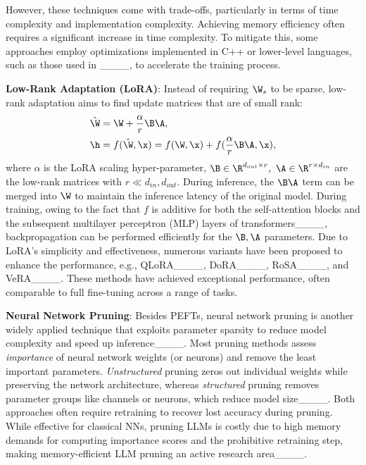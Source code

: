 However, these techniques come with trade-offs, particularly in terms of time complexity and implementation complexity. Achieving memory efficiency often requires a significant increase in time complexity. To mitigate this, some approaches employ optimizations implemented in C++ or lower-level languages, such as those used in ____, to accelerate the training process. 

\textbf{Low-Rank Adaptation (LoRA)}: Instead of requiring $\W_s$ to be sparse, low-rank adaptation aims to find update matrices that are of small rank:
\begin{align}
    & \hat{\W}=\W + \frac{\alpha}{r}\B\A \label{eq:lora_w}, \\
    & \h = f(\hat{\W}, \x) = f(\W, \x) + f(\frac{\alpha}{r}\B\A, \x), \label{eq:lora_fwd}
\end{align}
where $\alpha$ is the LoRA scaling hyper-parameter, \iffalse $r$ is the middle dimensionality of the low-rank matrices, \fi$\B\in \R^{d_{out}\times r},\ \A\in \R^{r\times d_{in}}$ are the low-rank matrices with $r\ll d_{in},d_{out}$. During inference, the $\B \A$ term can be merged into $\W$ to maintain the inference latency of the original model. During training, owing to the fact that $f$ is additive for both the self-attention blocks and the subsequent multilayer perceptron (MLP) layers of transformers____, backpropagation can be performed efficiently for the $\B, \A$ parameters. Due to LoRA's simplicity and effectiveness, numerous variants have been proposed to enhance the performance, e.g., QLoRA____, DoRA____, RoSA____, and VeRA____. %
These methods have achieved exceptional performance, often comparable to full fine-tuning across a range of tasks.

%
%

\textbf{Neural Network Pruning}:
Besides PEFTs, neural network pruning is another widely applied technique that exploits parameter sparsity to reduce model complexity and speed up inference____. Most pruning methods assess \emph{importance} of neural network weights (or neurons) and remove the least important parameters. \emph{Unstructured} pruning zeros out individual weights while preserving the network architecture, whereas \emph{structured} pruning removes parameter groups like channels or neurons, which reduce model size____. Both approaches often require retraining to recover lost accuracy during pruning. While effective for classical NNs, pruning LLMs is costly due to high memory demands for computing importance scores and the prohibitive retraining step, making memory-efficient LLM pruning an active research area____.

